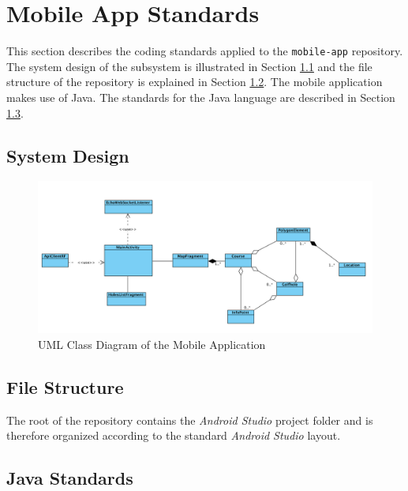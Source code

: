 \documentclass{article}
\begin{document}
    \newpage
    

    \section{Mobile App Standards}
    \label{sec:mobile-app}

    This section describes the coding standards applied to the
    \texttt{mobile-app} repository. The system design of the subsystem is
    illustrated in Section \ref{sec:ma-design} and the file structure of the
    repository is explained in Section \ref{sec:ma-struc}. The mobile
    application makes use of Java. The standards for the Java language are
    described in Section \ref{sec:java}.

    \subsection{System Design}
    \label{sec:ma-design}

    \begin{figure}[h!]
        \centering
        \includegraphics[scale=0.4]{MobileClassDiagram}
        \caption{UML Class Diagram of the Mobile Application}
        \label{fig:mobuml}
    \end{figure}

    \subsection{File Structure}
    \label{sec:ma-struc}

    The root of the repository contains the \textit{Android Studio} project
    folder and is therefore organized according to the standard \textit{Android
    Studio} layout.

    \subsection{Java Standards}
    \label{sec:java}
\end{document}
